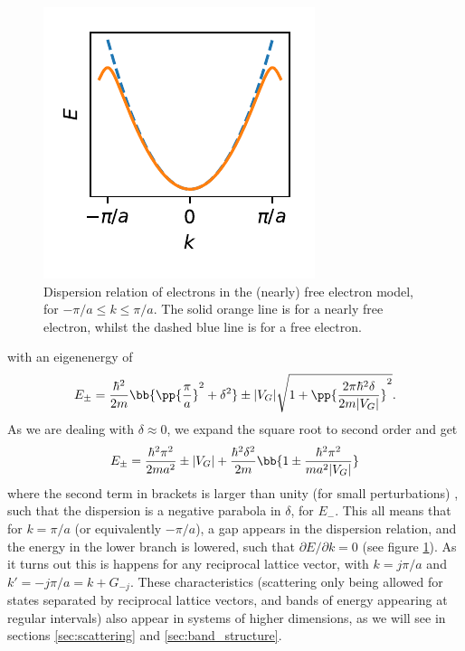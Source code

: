 \documentclass[main.tex]{subfiles}
\begin{document}
	\begin{figure}
		\begin{center}
			\includegraphics[width=\linewidth]{figures/nearly_free.pdf}
		\end{center}
		\caption{Dispersion relation of electrons in the (nearly) free electron model, for $ -\pi/a \leq k \leq \pi/a $. The solid orange line is for a nearly free electron, whilst the dashed blue line is for a free electron.}
		\label{fig:nearly_free}
	\end{figure}
	with an eigenenergy of
	\begin{equation}
		E_{\pm} = \frac{\hbar^2}{2m} \bb{\pp{\frac{\pi}{a}}^2 + \delta^2 } \pm |V_G| \sqrt{1+ \pp{\frac{2\pi\hbar^2 \delta}{2m |V_G|}}^2 }.
	\end{equation}
	As we are dealing with $ \delta \approx 0 $, we expand the square root to second order and get
	\begin{equation}
		E_{\pm} = \frac{\hbar^2 \pi^2}{2m a^2} \pm |V_G| + \frac{\hbar^2 \delta^2}{2m} \bb{1 \pm \frac{\hbar^2 \pi^2}{m a^2 |V_G|}}
	\end{equation}
	where the second term in brackets is larger than unity (for small perturbations) \cite{simon}, such that the dispersion is a negative parabola in $ \delta $, for $ E_- $. This all means that for $ k =\pi/a$ (or equivalently $ -\pi/a $), a gap appears in the dispersion relation, and the energy in the lower branch is lowered, such that $ \partial E/ \partial k =0$ (see figure \ref{fig:nearly_free}). As it turns out this is happens for any reciprocal lattice vector, with $ k = j \pi/a $ and $ k'=-j \pi /a = k+G_{-j}$. These characteristics (scattering only being allowed for states separated by reciprocal lattice vectors, and bands of energy appearing at regular intervals) also appear in systems of higher dimensions, as we will see in sections \ref{sec:scattering} and \ref{sec:band_structure}.
	
\end{document}
